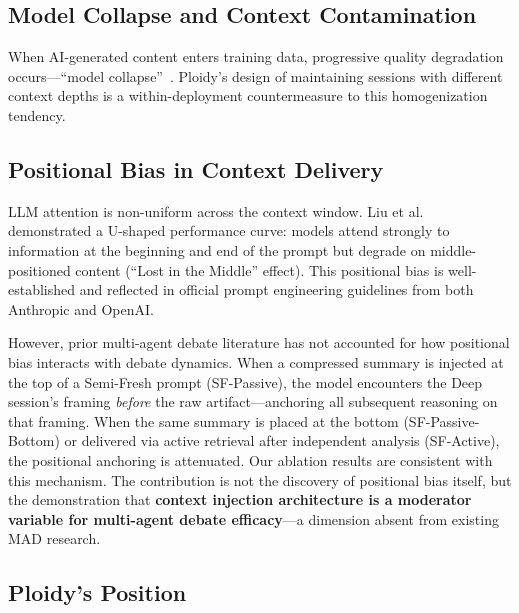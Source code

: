 \documentclass[11pt]{article}
\begin{document}
\subsection{Model Collapse and Context Contamination}
\label{sec:collapse}

When AI-generated content enters training data, progressive quality degradation occurs---``model collapse''~\citep{shumailov2024collapse}. Ploidy's design of maintaining sessions with different context depths is a within-deployment countermeasure to this homogenization tendency.

\subsection{Positional Bias in Context Delivery}
\label{sec:positional-bias}

LLM attention is non-uniform across the context window. Liu et al.~\citep{liu2023lost} demonstrated a U-shaped performance curve: models attend strongly to information at the beginning and end of the prompt but degrade on middle-positioned content (``Lost in the Middle'' effect). This positional bias is well-established and reflected in official prompt engineering guidelines from both Anthropic and OpenAI.

However, prior multi-agent debate literature has not accounted for how positional bias interacts with debate dynamics. When a compressed summary is injected at the top of a Semi-Fresh prompt (SF-Passive), the model encounters the Deep session's framing \emph{before} the raw artifact---anchoring all subsequent reasoning on that framing. When the same summary is placed at the bottom (SF-Passive-Bottom) or delivered via active retrieval after independent analysis (SF-Active), the positional anchoring is attenuated. Our ablation results are consistent with this mechanism. The contribution is not the discovery of positional bias itself, but the demonstration that \textbf{context injection architecture is a moderator variable for multi-agent debate efficacy}---a dimension absent from existing MAD research.

\subsection{Ploidy's Position}
\label{sec:position}
\end{document}
